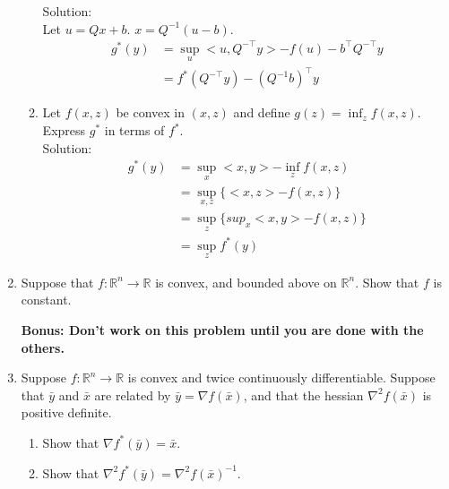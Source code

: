 \documentclass[12pt]{amsart}
\begin{document}
\begin{enumerate}
\begin{enumerate}
\noindent
Solution:\\
Let $u = Qx + b$.  $x = Q^{-1}(u-b)$.
\begin{align*}
g^*(y) &= \sup_u <u, Q^{-\top} y> - f(u) - b^\top Q^{-\top} y\\
          &= f^*(Q^{-\top}y) - (Q^{-1} b)^\top y
\end{align*}

\item Let $f(x,z)$ be convex in $(x,z)$ and define $g(z) = \inf_z f(x,z)$. Express $g^*$ in terms of $f^*$.\\

\noindent
Solution:\\
\begin{align*}
g^*(y) &= \sup_x <x,y> - \inf_z f(x,z)\\
          &= \sup_{x,z} \{<x,z> - f(x,z)\}\\
	  &= \sup_z \{sup_x <x,y> - f(x,z)\}\\
          &= \sup_z f^*(y)
\end{align*}
\end{enumerate}



\item Suppose that $f: \mathbb{R}^n \rightarrow \mathbb{R}$ is convex, and bounded above on $\mathbb{R}^n$. Show that $f$ is constant. 


\vspace{2in}

{\bf Bonus: Don't work on this problem until you are done with the others. }

\item Suppose $f: \mathbb{R}^n \rightarrow \mathbb{R}$ is convex and twice continuously differentiable. Suppose that $\bar y$ and $\bar x$ 
are related by $\bar y = \nabla f(\bar x)$, and that the hessian $\nabla^2 f(\bar x)$ is positive definite. 

\begin{enumerate}
\item  Show that $\nabla f^* (\bar y) = \bar x$. 

\item Show that $\nabla^2 f^* (\bar y) = \nabla^2 f(\bar x)^{-1}$.

\end{enumerate}

\end{enumerate}
\end{document}
